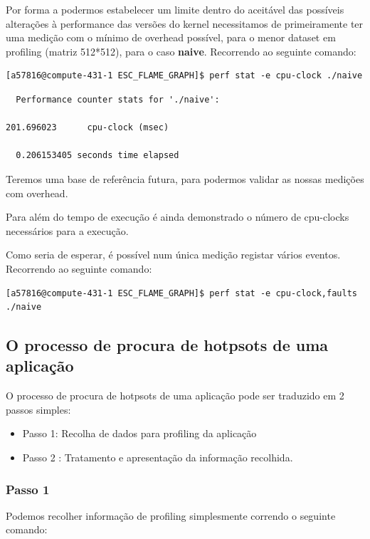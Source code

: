 \documentclass[conference,compsoc]{IEEEtran}
\begin{document}
  Por forma 	a podermos estabelecer um limite dentro do aceitável das possíveis alterações à performance das versões do kernel necessitamos de primeiramente ter uma medição com o mínimo de overhead possível, para o menor dataset em profiling (matriz 512*512), para o caso \textbf{naive}. Recorrendo ao seguinte comando:

  \begin{lstlisting}[style=command]
  [a57816@compute-431-1 ESC_FLAME_GRAPH]$ perf stat -e cpu-clock ./naive
  \end{lstlisting}
  \begin{lstlisting}
  Performance counter stats for './naive':

201.696023      cpu-clock (msec)                                            

  0.206153405 seconds time elapsed
  \end{lstlisting}
  Teremos uma base de referência futura, para podermos validar as nossas medições com overhead.\par 
  Para além do tempo de execução é ainda demonstrado o número de cpu-clocks necessários para a execução.\par  

  Como seria de esperar, é possível num única medição registar vários eventos. Recorrendo ao seguinte comando:

  \begin{lstlisting}[style=command]
  [a57816@compute-431-1 ESC_FLAME_GRAPH]$ perf stat -e cpu-clock,faults ./naive
  \end{lstlisting}

  \subsection{O processo de procura de hotpsots de uma aplicação}       

  O processo de procura de hotpsots de uma aplicação pode ser traduzido em 2 passos simples:
  \begin{itemize}
  \item Passo 1: Recolha de dados para profiling da aplicação
  \item Passo 2 : Tratamento e apresentação da informação recolhida.
  \end{itemize}

  \subsubsection{Passo 1}
  Podemos recolher informação de profiling simplesmente correndo o seguinte comando:
  \label{passo1}
\end{document}
